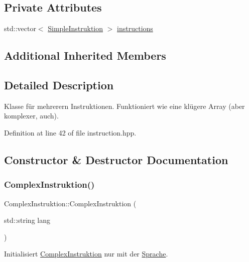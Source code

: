 \subsection*{Private Attributes}
\begin{DoxyCompactItemize}
\item 
std\+::vector$<$ \mbox{\hyperlink{class_simple_instruktion}{Simple\+Instruktion}} $>$ \mbox{\hyperlink{class_complex_instruktion_af8a7ed862ee24675b75750a470dcf22a}{instructions}}
\end{DoxyCompactItemize}
\subsection*{Additional Inherited Members}


\subsection{Detailed Description}
Klasse für mehrerern Instruktionen. Funktioniert wie eine klügere Array (aber komplexer, auch). 

Definition at line 42 of file instruction.\+hpp.



\subsection{Constructor \& Destructor Documentation}
\mbox{\label{class_complex_instruktion_a954dad29a6453083400008671c0c05eb}} 
\subsubsection{\texorpdfstring{Complex\+Instruktion()}{ComplexInstruktion()}\hspace{0.1cm}{\footnotesize\ttfamily [1/2]}}
{\footnotesize\ttfamily Complex\+Instruktion\+::\+Complex\+Instruktion (\begin{DoxyParamCaption}\item[{std\+::string}]{lang }\end{DoxyParamCaption})}

Initialisiert \mbox{\hyperlink{class_complex_instruktion}{Complex\+Instruktion}} nur mit der \mbox{\hyperlink{class_sprache}{Sprache}}. 

